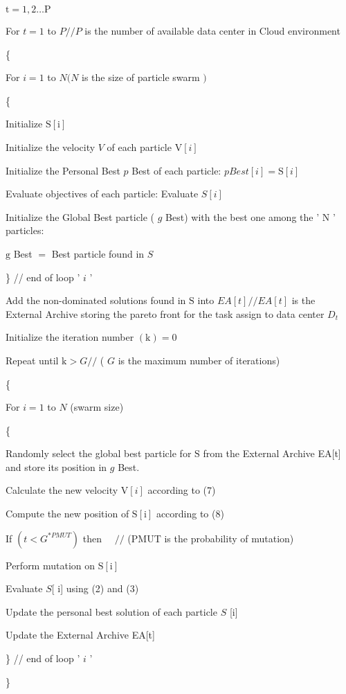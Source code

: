 \documentclass[10pt]{article}
\begin{document}
$\mathrm{t}=1,2 \ldots \mathrm{P}$

For $t=1$ to $P / / P$ is the number of available data center in Cloud environment

\{

For $i=1$ to $N(N$ is the size of particle swarm $)$

\{

Initialize $\mathrm{S}[\mathrm{i}]$

Initialize the velocity $V$ of each particle $\mathrm{V}[i]$

Initialize the Personal Best $p$ Best of each particle: $p B e s t[i]=\mathrm{S}[i]$

Evaluate objectives of each particle: Evaluate $S[i]$

Initialize the Global Best particle ( $g$ Best) with the best one among the ' $\mathrm{N}$ ' particles:

$\mathrm{g}$ Best $=$ Best particle found in $S$

\} // end of loop ' $i$ '

Add the non-dominated solutions found in $\mathrm{S}$ into $E A[t] / / E A[t]$ is the External Archive storing the pareto front for the task assign to data center $D_{t}$

Initialize the iteration number $(\mathrm{k})=0$

Repeat until $\mathrm{k}>G / /$ ( $G$ is the maximum number of iterations)

\{

For $i=1$ to $N$ (swarm size)

\{

Randomly select the global best particle for $\mathrm{S}$ from the External Archive EA[t] and store its position in $g$ Best.

Calculate the new velocity $\mathrm{V}[i]$ according to (7)

Compute the new position of $\mathrm{S}[\mathrm{i}]$ according to (8)

If $\left(t<G^{* P M U T}\right)$ then $\quad / /$ (PMUT is the probability of mutation)

Perform mutation on $\mathrm{S}[\mathrm{i}]$

Evaluate $S[$ i] using (2) and (3)

Update the personal best solution of each particle $S$ [i]

Update the External Archive EA[t]

\} // end of loop ' $i$ '

\}
\end{document}
